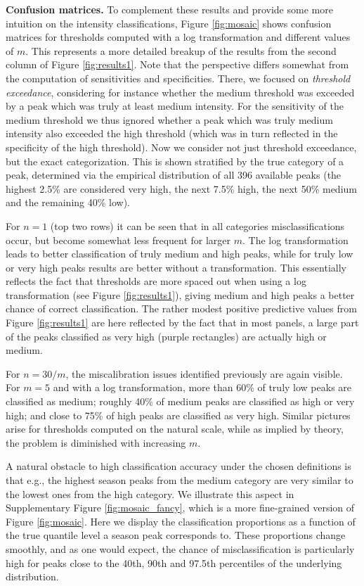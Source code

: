 \documentclass[12pt]{article}
\begin{document}
\textbf{Confusion matrices.} To complement these results and provide some more intuition on the intensity classifications, Figure \ref{fig:mosaic} shows confusion matrices for thresholds computed with a log transformation and different values of $m$. This represents a more detailed breakup of the results from the second column of Figure \ref{fig:results1}. Note that the perspective differs somewhat from the computation of sensitivities and specificities. There, we focused on \textit{threshold exceedance}, considering for instance whether the medium threshold was exceeded by a peak which was truly at least medium intensity. For the sensitivity of the medium threshold we thus ignored whether a peak which was truly medium intensity also exceeded the high threshold (which was in turn reflected in the specificity of the high threshold). Now we consider not just threshold exceedance, but the exact categorization. This is shown stratified by the true category of a peak, determined via the empirical distribution of all 396 available peaks (the highest 2.5\% are considered very high, the next 7.5\% high, the next 50\% medium and the remaining 40\% low).

For $n = 1$ (top two rows) it can be seen that in all categories misclassifications occur, but become somewhat less frequent for larger $m$. The log transformation leads to better classification of truly medium and high peaks, while for truly low or very high peaks results are better without a transformation. This essentially reflects the fact that thresholds are more spaced out when using a log transformation (see Figure \ref{fig:results1}), giving medium and high peaks a better chance of correct classification. The rather modest positive predictive values from Figure \ref{fig:results1} are here reflected by the fact that in most panels, a large part of the peaks classified as very high (purple rectangles) are actually high or medium.

For $n = 30/m$, the miscalibration issues identified previously are again visible. For $m = 5$ and with a log transformation, more than 60\% of truly low peaks are classified as medium; roughly 40\% of medium peaks are classified as high or very high; and close to 75\% of high peaks are classified as very high. Similar pictures arise for thresholds computed on the natural scale, while as implied by theory, the problem is diminished with increasing $m$.

A natural obstacle to high classification accuracy under the chosen definitions is that e.g., the highest season peaks from the medium category are very similar to the lowest ones from the high category. We illustrate this aspect in Supplementary Figure \ref{fig:mosaic_fancy}, which is a more fine-grained version of Figure \ref{fig:mosaic}. Here we display the classification proportions as a function of the true quantile level a season peak corresponds to. These proportions change smoothly, and as one would expect, the chance of misclassification is particularly high for peaks close to the 40th, 90th and 97.5th percentiles of the underlying distribution.
\end{document}
